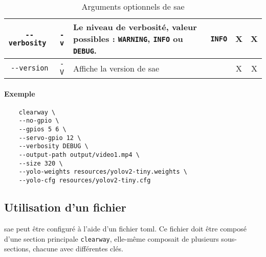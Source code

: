 \begin{table}[H]
\begin{tabularx}{\linewidth}{|c|c|X|c|c|c|}
        \texttt{-{}-verbosity }                              & \texttt{-v}                                       & Le niveau de verbosité, valeur possibles : \texttt{WARNING}, \texttt{INFO} ou \texttt{DEBUG}.                   & \texttt{INFO}                                                 & X                                                         & X                                   \\\hline
        \texttt{-{}-version}                                 & \texttt{-V}                                       & Affiche la version de \gls{sae}                                                                                 &                                                               & X                                                         & X                                   \\\hline
    \end{tabularx}
    \label{tabOptClearway}
    \caption{Arguments optionnels de \gls{sae}}
\end{table}

\paragraph{Exemple}

\begin{verbatim}
    clearway \
    --no-gpio \
    --gpios 5 6 \
    --servo-gpio 12 \
    --verbosity DEBUG \
    --output-path output/video1.mp4 \
    --size 320 \
    --yolo-weights resources/yolov2-tiny.weights \
    --yolo-cfg resources/yolov2-tiny.cfg
\end{verbatim}

\subsection{Utilisation d'un fichier }
\label{sec:executionTOML_clearWay}

\gls{sae} peut être configuré à l'aide d'un fichier \gls{toml}. Ce fichier doit être composé
d'une section principale \texttt{clearway}, elle-même composait de plusieurs sous-sections, chacune avec différentes clés.

